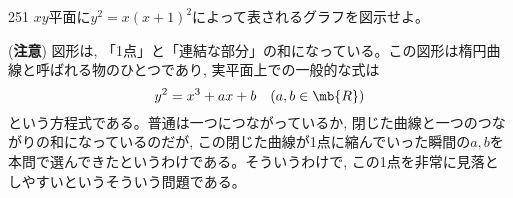\begin{thm}{251}{}{}
 $xy$平面に$y^2=x(x+1)^2$によって表されるグラフを図示せよ。\\
\end{thm}

(\textbf{注意}) 図形は, 「1点」と「連結な部分」の和になっている。この図形は楕円曲線と呼ばれる物のひとつであり, 実平面上での一般的な式は
\[y^2 = x^3+ ax + b\quad (a,b\in \mb{R})\]
という方程式である。普通は一つにつながっているか, 閉じた曲線と一つのつながりの和になっているのだが, この閉じた曲線が1点に縮んでいった瞬間の$a,b$を本問で選んできたというわけである。そういうわけで, この1点を非常に見落としやすいというそういう問題である。
